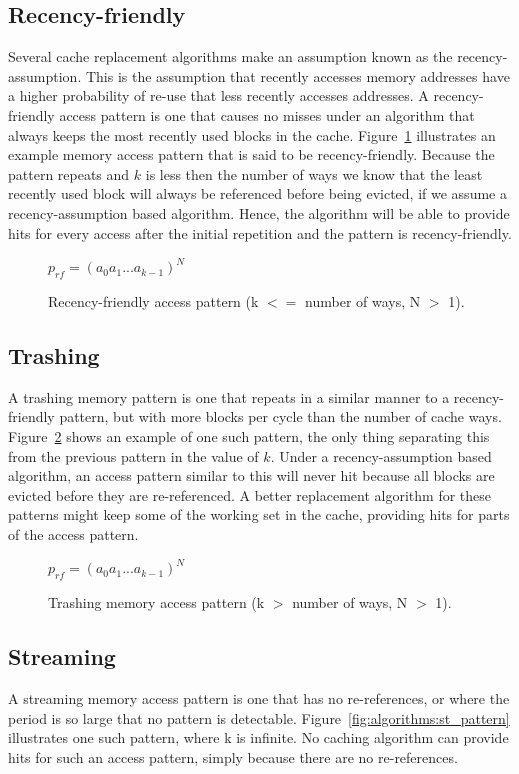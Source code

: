 \subsection{Recency-friendly}
Several cache replacement algorithms make an assumption known as the recency-assumption.
This is the assumption that recently accesses memory addresses have a higher probability of re-use that less recently accesses addresses.
A recency-friendly access pattern is one that causes no misses under an algorithm that always keeps the most recently used blocks in the cache.
Figure~\ref{fig:algorithms:rf_pattern} illustrates an example memory access pattern that is said to be recency-friendly.
Because the pattern repeats and $k$ is less then the number of ways we know that the least recently used block will always be referenced before being evicted, if we assume a recency-assumption based algorithm.
Hence, the algorithm will be able to provide hits for every access after the initial repetition and the pattern is recency-friendly.

\begin{figure}[ht]
\centering
$p_{rf} = (a_0 a_1 ... a_{k-1})^N$
\label{fig:algorithms:rf_pattern}
\caption{Recency-friendly access pattern (k $<=$ number of ways, N $>$ 1).}
\end{figure}

\subsection{Trashing}
A trashing memory pattern is one that repeats in a similar manner to a recency-friendly pattern, but with more blocks per cycle than the number of cache ways. 
Figure~\ref{fig:algorithms:tr_pattern} shows an example of one such pattern, the only thing separating this from the previous pattern in the value of $k$.
Under a recency-assumption based algorithm, an access pattern similar to this will never hit because all blocks are evicted before they are re-referenced.
A better replacement algorithm for these patterns might keep some of the working set in the cache, providing hits for parts of the access pattern.
\begin{figure}[ht]
\centering
$p_{rf} = (a_0 a_1 ... a_{k-1})^N$
\label{fig:algorithms:tr_pattern}
\caption{Trashing memory access pattern (k $>$ number of ways, N $>$ 1).}
\end{figure}

\subsection{Streaming}
A streaming memory access pattern is one that has no re-references, or where the period is so large that no pattern is detectable.
Figure~\ref{fig:algorithms:st_pattern} illustrates one such pattern, where k is infinite.
No caching algorithm can provide hits for such an access pattern, simply because there are no re-references.

